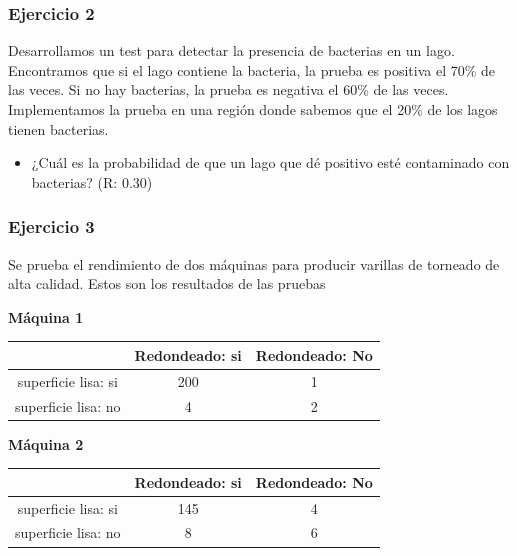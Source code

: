 \documentclass[
]{book}
\providecommand{\tightlist}{%
  \setlength{\itemsep}{0pt}\setlength{\parskip}{0pt}}
\begin{document}
\hypertarget{ejercicio-2-1}{%
\subsubsection{Ejercicio 2}\label{ejercicio-2-1}}

Desarrollamos un test para detectar la presencia de bacterias en un lago. Encontramos que si el lago contiene la bacteria, la prueba es positiva el 70\% de las veces. Si no hay bacterias, la prueba es negativa el 60\% de las veces. Implementamos la prueba en una región donde sabemos que el 20\% de los lagos tienen bacterias.

\begin{itemize}
\tightlist
\item
  ¿Cuál es la probabilidad de que un lago que dé positivo esté contaminado con bacterias? (R: 0.30)
\end{itemize}

\hypertarget{ejercicio-3-1}{%
\subsubsection{Ejercicio 3}\label{ejercicio-3-1}}

Se prueba el rendimiento de dos máquinas para producir varillas de torneado de alta calidad. Estos son los resultados de las pruebas

\textbf{Máquina 1}

\begin{longtable}[]{@{}ccc@{}}
\toprule\noalign{}
& Redondeado: si & Redondeado: No \\
\midrule\noalign{}
\endhead
\bottomrule\noalign{}
\endlastfoot
superficie lisa: si & 200 & 1 \\
superficie lisa: no & 4 & 2 \\
\end{longtable}

\textbf{Máquina 2}

\begin{longtable}[]{@{}ccc@{}}
\toprule\noalign{}
& Redondeado: si & Redondeado: No \\
\midrule\noalign{}
\endhead
\bottomrule\noalign{}
\endlastfoot
superficie lisa: si & 145 & 4 \\
superficie lisa: no & 8 & 6 \\
\end{longtable}
\end{document}

